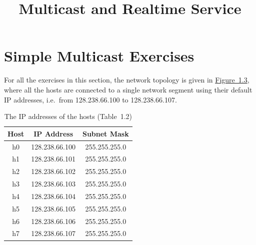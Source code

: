 \documentclass{../UTNetLab}
\title{Multicast and Realtime Service}
\begin{document}
\part{Simple Multicast Exercises\label{sec:simple-multicast}}
For all the exercises in this section, the network topology is given in \hyperref[fig:1.3]{Figure~1.3}, where all the hosts are connected to a single network segment using their default IP addresses, i.e.\ from 128.238.66.100 to 128.238.66.107.

\begin{minipage}{0.48\textwidth}
    \begin{flushleft}
        \begin{table}[H]
            \caption{The IP addresses of the hosts (Table~1.2)}
            \label{tab:1.2}
            \centering
            \begin{tabular}{ c c c }
                \hline \hline
                Host & IP Address     & Subnet Mask   \\
                \hline
                h0   & 128.238.66.100 & 255.255.255.0 \\
                h1   & 128.238.66.101 & 255.255.255.0 \\
                h2   & 128.238.66.102 & 255.255.255.0 \\
                h3   & 128.238.66.103 & 255.255.255.0 \\
                h4   & 128.238.66.104 & 255.255.255.0 \\
                h5   & 128.238.66.105 & 255.255.255.0 \\
                h6   & 128.238.66.106 & 255.255.255.0 \\
                h7   & 128.238.66.107 & 255.255.255.0 \\
                \hline \hline
            \end{tabular}
        \end{table}
    \end{flushleft}
\end{minipage}
\end{document}
